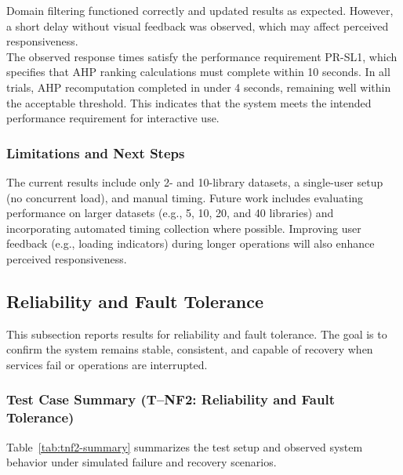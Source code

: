 \documentclass[12pt, titlepage]{article}
\begin{document}
Domain filtering functioned correctly and updated results as expected.
However, a short delay without visual feedback was observed, which may affect
perceived responsiveness.\\
\noindent The observed response times satisfy the performance requirement PR-SL1, which specifies that AHP ranking calculations must complete within 10 seconds. In all trials, AHP recomputation completed in under 4 seconds, remaining well within the acceptable threshold. This indicates that the system meets the intended performance requirement for interactive use.

\subsubsection{Limitations and Next Steps}
The current results include only 2- and 10-library datasets, a single-user setup
(no concurrent load), and manual timing.
Future work includes evaluating performance on larger datasets (e.g., 5, 10,
20, and 40 libraries) and incorporating automated timing collection where
possible. Improving user feedback (e.g., loading indicators) during longer
operations will also enhance perceived responsiveness.

\subsection{Reliability and Fault Tolerance}
\label{sec:nfr-reliability}

This subsection reports results for reliability and fault
tolerance. The goal is to confirm the system remains stable, consistent, and
capable of recovery when services fail or operations are interrupted.

\subsubsection{Test Case Summary (T--NF2: Reliability and Fault Tolerance)}
Table~\ref{tab:tnf2-summary} summarizes the test setup and observed system behavior under simulated failure and recovery scenarios.
\end{document}
